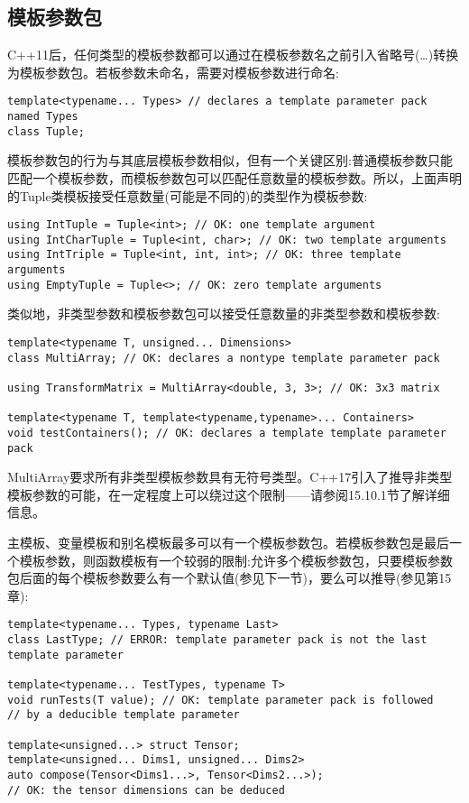 \subsection{模板参数包}

C++11后，任何类型的模板参数都可以通过在模板参数名之前引入省略号(…)转换为模板参数包。若板参数未命名，需要对模板参数进行命名:

\begin{lstlisting}[style=styleCXX]
template<typename... Types> // declares a template parameter pack named Types
class Tuple;
\end{lstlisting}

模板参数包的行为与其底层模板参数相似，但有一个关键区别:普通模板参数只能匹配一个模板参数，而模板参数包可以匹配任意数量的模板参数。所以，上面声明的Tuple类模板接受任意数量(可能是不同的)的类型作为模板参数:

\begin{lstlisting}[style=styleCXX]
using IntTuple = Tuple<int>; // OK: one template argument
using IntCharTuple = Tuple<int, char>; // OK: two template arguments
using IntTriple = Tuple<int, int, int>; // OK: three template arguments
using EmptyTuple = Tuple<>; // OK: zero template arguments
\end{lstlisting}

类似地，非类型参数和模板参数包可以接受任意数量的非类型参数和模板参数:

\begin{lstlisting}[style=styleCXX]
template<typename T, unsigned... Dimensions>
class MultiArray; // OK: declares a nontype template parameter pack

using TransformMatrix = MultiArray<double, 3, 3>; // OK: 3x3 matrix

template<typename T, template<typename,typename>... Containers>
void testContainers(); // OK: declares a template template parameter pack
\end{lstlisting}

MultiArray要求所有非类型模板参数具有无符号类型。C++17引入了推导非类型模板参数的可能，在一定程度上可以绕过这个限制——请参阅15.10.1节了解详细信息。

主模板、变量模板和别名模板最多可以有一个模板参数包。若模板参数包是最后一个模板参数，则函数模板有一个较弱的限制:允许多个模板参数包，只要模板参数包后面的每个模板参数要么有一个默认值(参见下一节)，要么可以推导(参见第15章):

\begin{lstlisting}[style=styleCXX]
template<typename... Types, typename Last>
class LastType; // ERROR: template parameter pack is not the last template parameter

template<typename... TestTypes, typename T>
void runTests(T value); // OK: template parameter pack is followed
// by a deducible template parameter

template<unsigned...> struct Tensor;
template<unsigned... Dims1, unsigned... Dims2>
auto compose(Tensor<Dims1...>, Tensor<Dims2...>);
// OK: the tensor dimensions can be deduced
\end{lstlisting}

